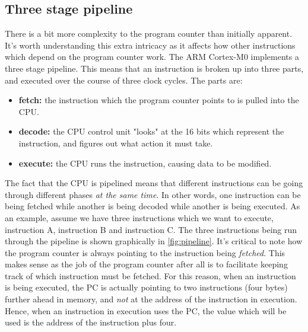 \subsection{Three stage pipeline}
There is a bit more complexity to the program counter than initially apparent. It's worth understanding this extra intricacy as it affects how other instructions which depend on the program counter work. 
The ARM Cortex-M0 implements a three stage pipeline. This means that an instruction is broken up into three parts, and executed over the course of three clock cycles. The parts are:
\begin{itemize}
\item \textbf{fetch:} the instruction which the program counter points to is pulled into the CPU.
\item \textbf{decode:} the CPU control unit "looks" at the 16 bits which represent the instruction, and figures out what action it must take.
\item \textbf{execute:} the CPU runs the instruction, causing data to be modified.
\end{itemize}
The fact that the CPU is pipelined means that different instructions can be going through different phases \emph{at the same time}. In other words, one instruction can be being fetched while another is being decoded while another is being executed. 
As an example, assume we have three instructions which we want to execute, instruction A, instruction B and instruction C. The three instructions being run through the pipeline is shown graphically in \autoref{fig:pipeline}. It's critical to note how the program counter is always pointing to the instruction being \emph{fetched}. This makes sense as the job of the program counter after all is to facilitate keeping track of which instruction must be fetched. For this reason, when an instruction is being executed, the PC is actually pointing to two instructions (four bytes) further ahead in memory, and \emph{not} at the address of the instruction in execution. Hence, when an instruction in execution uses the PC, the value which will be used is the address of the instruction plus four.
